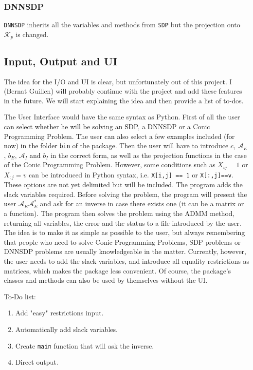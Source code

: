 \documentclass[paper=a4, fontsize=11pt]{scrartcl}
\numberwithin{equation}{section}		%
\numberwithin{figure}{section}			%
\numberwithin{table}{section}				%
\begin{document}
\subsubsection{DNNSDP}
\texttt{DNNSDP} inherits all the variables and methods from \texttt{SDP} but the projection onto $\mathcal{K}_p$ is changed.
\subsection{Input, Output and UI}
The idea for the I/O and UI is clear, but unfortunately out of this project. I (Bernat Guillen) will probably continue with the project and add these features in the future. We will start explaining the idea and then provide a list of to-dos.

The User Interface would have the same syntax as Python. First of all the user can select whether he will be solving an SDP, a DNNSDP or a Conic Programming Problem. The user can also select a few examples included (for now) in the folder \texttt{bin} of the package. Then the user will have to introduce $c$, $\mathcal{A}_E$, $b_E$, $\mathcal{A}_I$ and $b_I$ in the correct form, as well as the projection functions in the case of the Conic Programming Problem. However, some conditions such as $X_{ij} = 1$ or $X_{:j} = v$ can be introduced in Python syntax, i.e. \texttt{X[i,j] == 1} or \texttt{X[:,j]==v}. These options are not yet delimited but will be included. The program adds the slack variables required. Before solving the problem, the program will present the user $\mathcal{A}_E\mathcal{A}_E^*$ and ask for an inverse in case there exists one (it can be a matrix or a function). The program then solves the problem using the ADMM method, returning all variables, the error and the status to a file introduced by the user. The idea is to make it as simple as possible to the user, but always remembering that people who need to solve Conic Programming Problems, SDP problems or DNNSDP problems are usually knowledgeable in the matter. Currently, however, the user needs to add the slack variables, and introduce all equality restrictions as matrices, which makes the package less convenient. Of course, the package's classes and methods can also be used by themselves without the UI.

To-Do list:
\begin{enumerate}
\item Add "easy" restrictions input.
\item Automatically add slack variables.
\item Create \texttt{main} function that will ask the inverse.
\item Direct output.
\end{enumerate}
\end{document}
